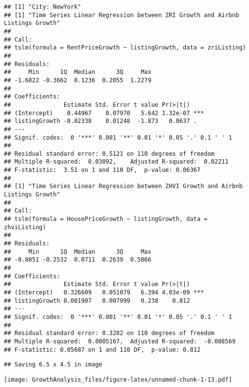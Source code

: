 \documentclass[
]{article}
\begin{document}
\begin{verbatim}
## [1] "City: NewYork"
## [1] "Time Series Linear Regression between ZRI Growth and Airbnb Listings Growth"
## 
## Call:
## tslm(formula = RentPriceGrowth ~ listingGrowth, data = zriListing)
## 
## Residuals:
##     Min      1Q  Median      3Q     Max 
## -1.6022 -0.3662  0.1236  0.2055  1.2279 
## 
## Coefficients:
##               Estimate Std. Error t value Pr(>|t|)    
## (Intercept)    0.44967    0.07970   5.642 1.32e-07 ***
## listingGrowth -0.02338    0.01248  -1.873   0.0637 .  
## ---
## Signif. codes:  0 '***' 0.001 '**' 0.01 '*' 0.05 '.' 0.1 ' ' 1
## 
## Residual standard error: 0.5121 on 110 degrees of freedom
## Multiple R-squared:  0.03092,    Adjusted R-squared:  0.02211 
## F-statistic:  3.51 on 1 and 110 DF,  p-value: 0.06367
## 
## [1] "Time Series Linear Regression between ZHVI Growth and Airbnb Listings Growth"
## 
## Call:
## tslm(formula = HousePriceGrowth ~ listingGrowth, data = zhviListing)
## 
## Residuals:
##     Min      1Q  Median      3Q     Max 
## -0.8051 -0.2532  0.0711  0.2639  0.5866 
## 
## Coefficients:
##               Estimate Std. Error t value Pr(>|t|)    
## (Intercept)   0.326609   0.051079   6.394 4.03e-09 ***
## listingGrowth 0.001907   0.007999   0.238    0.812    
## ---
## Signif. codes:  0 '***' 0.001 '**' 0.01 '*' 0.05 '.' 0.1 ' ' 1
## 
## Residual standard error: 0.3282 on 110 degrees of freedom
## Multiple R-squared:  0.0005167,  Adjusted R-squared:  -0.008569 
## F-statistic: 0.05687 on 1 and 110 DF,  p-value: 0.812
\end{verbatim}

\begin{verbatim}
## Saving 6.5 x 4.5 in image
\end{verbatim}

\texttt{[image: GrowthAnalysis\_files/figure-latex/unnamed-chunk-1-13.pdf]}
\end{document}
